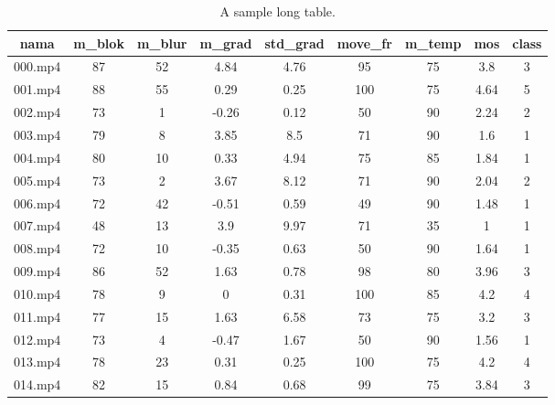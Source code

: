\begin{enumerate}
\fontsize{9pt}{9pt}\selectfont
\centering
\begin{longtable}{|c|c|c|c|c|c|c|c|c|}
\caption{A sample long table.} \label{tab:long} \\
		\hline
		\rowcolor[HTML]{EFEFEF} 
		nama    & m\_blok & m\_blur & m\_grad & std\_grad & move\_fr & m\_temp& mos  & class \\ \hline
		000.mp4 & 87      & 52      & 4.84    & 4.76      & 95          & 75          & 3.8  & 3     \\ \hline
		001.mp4 & 88      & 55      & 0.29    & 0.25      & 100         & 75          & 4.64 & 5     \\ \hline
		002.mp4 & 73      & 1       & -0.26   & 0.12      & 50          & 90          & 2.24 & 2     \\ \hline
		003.mp4 & 79      & 8       & 3.85    & 8.5       & 71          & 90          & 1.6  & 1     \\ \hline
		004.mp4 & 80      & 10      & 0.33    & 4.94      & 75          & 85          & 1.84 & 1     \\ \hline
		005.mp4 & 73      & 2       & 3.67    & 8.12      & 71          & 90          & 2.04 & 2     \\ \hline
		006.mp4 & 72      & 42      & -0.51   & 0.59      & 49          & 90          & 1.48 & 1     \\ \hline
		007.mp4 & 48      & 13      & 3.9     & 9.97      & 71          & 35          & 1    & 1     \\ \hline
		008.mp4 & 72      & 10      & -0.35   & 0.63      & 50          & 90          & 1.64 & 1     \\ \hline
		009.mp4 & 86      & 52      & 1.63    & 0.78      & 98          & 80          & 3.96 & 3     \\ \hline
		010.mp4 & 78      & 9       & 0       & 0.31      & 100         & 85          & 4.2  & 4     \\ \hline
		011.mp4 & 77      & 15      & 1.63    & 6.58      & 73          & 75          & 3.2  & 3     \\ \hline
		012.mp4 & 73      & 4       & -0.47   & 1.67      & 50          & 90          & 1.56 & 1     \\ \hline
		013.mp4 & 78      & 23      & 0.31    & 0.25      & 100         & 75          & 4.2  & 4     \\ \hline
		014.mp4 & 82      & 15      & 0.84    & 0.68      & 99          & 75          & 3.84 & 3     \\ \hline

\end{longtable}
\end{enumerate}
